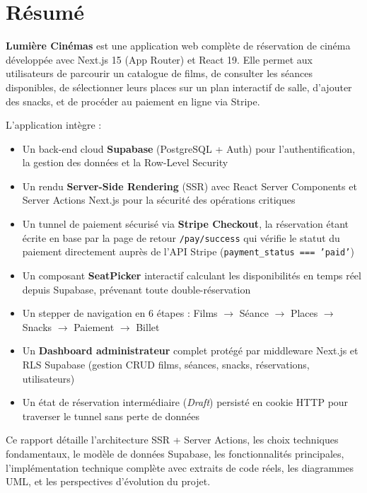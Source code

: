 \documentclass[12pt,a4paper,openany]{report}
\begin{document}
\newpage
\thispagestyle{empty}
\mbox{}

\newpage
\chapter*{Résumé}

\noindent\textbf{Lumière Cinémas} est une application web complète de réservation de cinéma développée avec Next.js 15 (App Router) et React 19. Elle permet aux utilisateurs de parcourir un catalogue de films, de consulter les séances disponibles, de sélectionner leurs places sur un plan interactif de salle, d'ajouter des snacks, et de procéder au paiement en ligne via Stripe.

L'application intègre :
\begin{itemize}
  \item Un back-end cloud \textbf{Supabase} (PostgreSQL + Auth) pour l'authentification, la gestion des données et la Row-Level Security
  \item Un rendu \textbf{Server-Side Rendering} (SSR) avec React Server Components et Server Actions Next.js pour la sécurité des opérations critiques
  \item Un tunnel de paiement sécurisé via \textbf{Stripe Checkout}, la réservation étant écrite en base par la page de retour \texttt{/pay/success} qui vérifie le statut du paiement directement auprès de l'API Stripe (\texttt{payment\_status === 'paid'})
  \item Un composant \textbf{SeatPicker} interactif calculant les disponibilités en temps réel depuis Supabase, prévenant toute double-réservation
  \item Un stepper de navigation en 6 étapes : Films $\rightarrow$ Séance $\rightarrow$ Places $\rightarrow$ Snacks $\rightarrow$ Paiement $\rightarrow$ Billet
  \item Un \textbf{Dashboard administrateur} complet protégé par middleware Next.js et RLS Supabase (gestion CRUD films, séances, snacks, réservations, utilisateurs)
  \item Un état de réservation intermédiaire (\textit{Draft}) persisté en cookie HTTP pour traverser le tunnel sans perte de données
\end{itemize}

Ce rapport détaille l'architecture SSR + Server Actions, les choix techniques fondamentaux, le modèle de données Supabase, les fonctionnalités principales, l'implémentation technique complète avec extraits de code réels, les diagrammes UML, et les perspectives d'évolution du projet.
\end{document}
